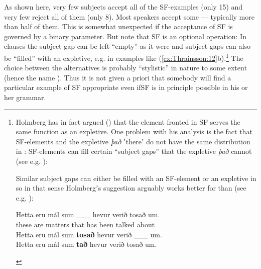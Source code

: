 \documentclass[output=paper]{LSP/langsci}
\begin{document}
As shown here, very few subjects accept all of the SF-examples (only 15) and very few reject all of them (only 8). Most speakers accept some — typically more than half of them. This is somewhat unexpected if the acceptance of SF is governed by a binary parameter. But note that SF is an optional operation: In  clauses the subject gap can be left “empty” as it were and subject gaps can also be “filled” with an expletive, e.g. in examples like (\ref{ex:Thrainsson:12}b).\footnote{Holmberg has in fact argued (\citeyear{Holmberg2000}) that the element fronted in SF serves the same function as an expletive. One problem with his analysis is the fact that SF-elements and the expletive \textit{það} ʽthereʼ do not have the same distribution in : SF-elements can fill certain “subject gaps” that the expletive \textit{það} cannot (see e.g. \citealt[351]{Thráinsson2007}):
	
	\begin{xlist}
		\begin{xlista}

	    \end{xlista}
	\end{xlist}
Similar subject gaps can either be filled with an SF-element or an expletive in  so in that sense Holmbergʼs suggestion arguably works better for  than   (see e.g. \citealt[170]{Angantýsson2011}):

\begin{xlist}
	\exi{(ii)}
	\begin{xlista}
		\ex \gll Hetta  eru   mál    sum  \uline{~~~~}    hevur  verið  tosað  um.\\
		these  are   matters  that   {}   has    been  talked  about \\
		\ex   Hetta  eru   mál    sum  \textbf{tosað} hevur  verið  \uline{~~~~}    um.\\
		\ex Hetta  eru   mál    sum  \textbf{tað}    hevur  verið  tosað  um.\\
	\end{xlista}
\end{xlist}}
\largerpage
The choice between the alternatives is probably “stylistic” in nature to some extent (hence the name ). Thus it is not given a priori that somebody will find a particular example of SF appropriate even if\largerpage SF is in principle possible in his or her grammar.
\end{document}
